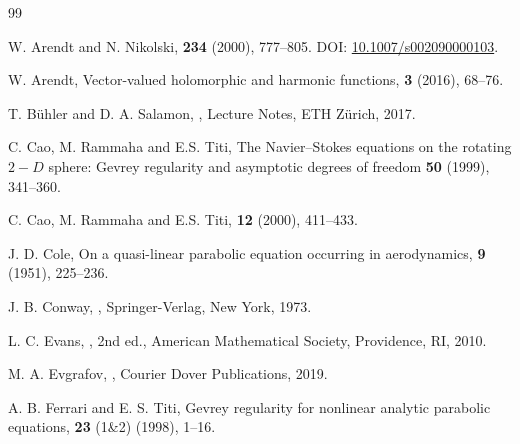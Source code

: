 \documentclass[12pt]{article}
\theoremstyle{plain}
\theoremstyle{remark}
\begin{document}
\begin{thebibliography}{99}

W. Arendt and N. Nikolski,
 \textbf{234} (2000), 777--805.
\newblock DOI: \href{https://doi.org/10.1007/s002090000103}{10.1007/s002090000103}.

W. Arendt,
\newblock Vector-valued holomorphic and harmonic functions,
 \textbf{3} (2016), 68--76.

T. Bühler and D. A. Salamon,
,
\newblock Lecture Notes, ETH Zürich, 2017.

C. Cao, M. Rammaha and E.S. Titi,
\newblock The Navier--Stokes equations on the rotating $2-D$ sphere: Gevrey regularity and asymptotic degrees of freedom
 \textbf{50} (1999), 341--360.

C. Cao, M. Rammaha and E.S. Titi,
\textbf {12} (2000), 411--433.


J. D. Cole,
\newblock On a quasi-linear parabolic equation occurring in aerodynamics,
 \textbf{9} (1951), 225--236.

J. B. Conway,
,
\newblock Springer-Verlag, New York, 1973.


L. C. Evans,
,
\newblock 2nd ed., American Mathematical Society, Providence, RI, 2010.

M. A. Evgrafov,
,
\newblock Courier Dover Publications, 2019.

A. B. Ferrari and E. S. Titi,
\newblock Gevrey regularity for nonlinear analytic parabolic equations,
 \textbf{23} (1\&2) (1998), 1--16.


\end{thebibliography}
\end{document}
